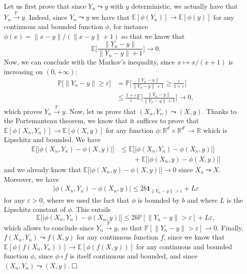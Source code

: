 \documentclass[
	fontsize=11pt, %
	twoside=false, %
	numbers=noenddot, %
]{kaobook}
\newcommand{\eps}{\varepsilon}
\renewcommand{\P}{\mathbb P}
\newcommand{\E}{\mathbb E}
\newcommand{\R}{\mathbb R}
\newcommand{\ind}[1]{\mathbf 1_{#1}}
\newcommand{\go}{\rightarrow}
\newcommand{\norm}[1]{\| #1 \|}
\newcommand{\gopro}{\overset{\P}{\rightarrow}}
\newcommand{\gosto}{\leadsto}
\begin{document}
Let us first prove that since $Y_n \gosto y$ with $y$ deterministic, we actually have that $Y_n \gopro y$.
Indeed, since $Y_n \gosto y$ we have that $\E [\phi(Y_n)] \go \E [\phi(y)]$ for any continuous and bounded function $\phi$, for instance $\phi(x) = \norm{x - y} / (\norm{x - y} + 1)$ so that we know that
\begin{equation*}
	\E \Big[ \frac{\norm{Y_n - y}}{\norm{Y_n - y} + 1} \Big] \go 0.
\end{equation*}
Now, we can conclude with the Markov's inequality, since $x \mapsto x / (x + 1)$ is increasing on $(0, +\infty)$:
\begin{align*}
	\P\big[ \norm{Y_n - y} \geq \eps\big] &= \P\Big[ \frac{\norm{Y_n - y}}{\norm{Y_n - y} + 1} 
	\geq \frac{\eps}{1 + \eps} \Big] \\
	&\leq \frac{1 + \eps}{\eps} \E \Big[ \frac{\norm{Y_n - y}}{\norm{Y_n - y} + 1} \Big] \go 0,
\end{align*}
which proves $Y_n \gopro y$.
Now, let us prove that $(X_n, Y_n) \gosto (X, y)$. Thanks to the Portemanteau theorem, we know that it suffices to prove that $\E[\phi(X_n, Y_n)] \go \E[\phi(X, y)]$ for any function $\phi : \R^d \times \R^{d'} \go \R$ which is Lipschitz and bounded.
We have
\begin{align*}
	\E\big[ | \phi(X_n, Y_n) - \phi(X, y) | \big] &\leq \E\big[ | \phi(X_n, Y_n) - \phi(X_n, y) | \big] \\
	& \quad \quad + \E\big[ | \phi(X_n, y) - \phi(X, y) | \big] 
\end{align*}
and we already know that $\E\big[ | \phi(X_n, y) - \phi(X, y) | \big] \go 0$ since $X_n \gosto X$.
Moreover, we have 
\begin{align*}
	| \phi(X_n, Y_n) - \phi(X_n, y) | \leq 2 b\ind{\norm{Y_n - y} > \eps} + L \eps
\end{align*}
for any $\eps > 0$, where we used the fact that $\phi$ is bounded by $b$ and where $L$ is the Lipschitz constant of $\phi$.
This entails
\begin{equation*}
	\E \big[ | \phi(X_n, Y_n) - \phi(X_n, y) | \big] \leq 2 b \P[\norm{Y_n - y} > \eps] + L \eps,
\end{equation*}
which allows to conclude since $Y_n \gopro y$, so that $\P[\norm{Y_n - y} > \eps] \go 0$.
Finally, $f(X_n, Y_n) \gosto f(X, y)$ for any continuous function $f$, since we know that $\E[\phi(f(X_n, Y_n))] \go \E[\phi(f(X, y))]$ for any continuous and bounded function $\phi$, since $\phi \circ f$ is itself continuous and bounded, and since $(X_n, Y_n) \gosto (X, y)$. $\hfill \square$
\end{document}
